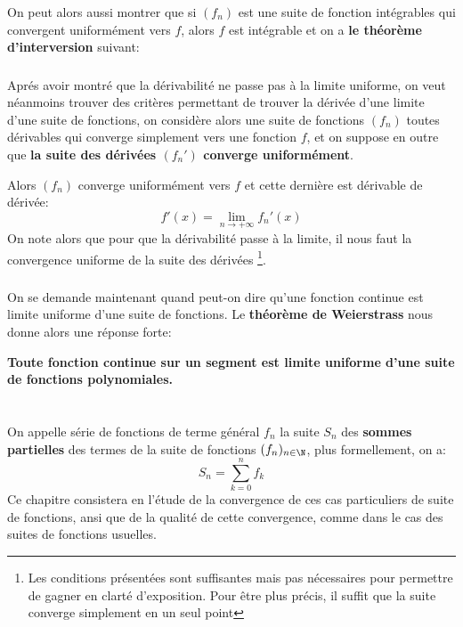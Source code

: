 \subsection*{}
On peut alors aussi montrer que si \((f_n)\) est une suite de fonction intégrables qui convergent uniformément vers \(f\), alors \(f\) est intégrable et on a \textbf{le théorème d'interversion} suivant:
\subsection*{}
Aprés avoir montré que la dérivabilité ne passe pas à la limite uniforme, on veut néanmoins trouver des critères permettant de trouver la dérivée d'une limite d'une suite de fonctions, on considère alors une suite de fonctions \((f_n)\) toutes dérivables qui converge simplement vers une fonction \(f\), et on suppose en outre que \textbf{la suite des dérivées \((f_n')\) converge uniformément}.\<

Alors \((f_n)\) converge uniformément vers \(f\) et cette dernière est dérivable de dérivée:
\[
   f'(x) = \lim_{n \rightarrow +\infty} f_n'(x)
\] 
On note alors que pour que la dérivabilité passe à la limite, il nous faut la convergence uniforme de la suite des dérivées \footnote[1]{Les conditions présentées sont suffisantes mais pas nécessaires pour permettre de gagner en clarté d'exposition. Pour être plus précis, il suffit que la suite converge simplement en un seul point}.
\subsection*{}
On se demande maintenant quand peut-on dire qu'une fonction continue est limite uniforme d'une suite de fonctions. Le \textbf{théorème de Weierstrass} nous donne alors une réponse forte:
\begin{center}
   \textbf{Toute fonction continue sur un segment est limite uniforme d'une suite de fonctions polynomiales.}
\end{center}

\chapter*{}
On appelle série de fonctions de terme général \(f_n\) la suite \(S_n\) des \textbf{sommes partielles} des termes de la suite de fonctions \((f_n)_{n\in\N}\), plus formellement, on a:
\[
   S_n = \sum_{k=0}^{n} f_k   
\]
Ce chapitre consistera en l'étude de la convergence de ces cas particuliers de suite de fonctions, ansi que de la qualité de cette convergence, comme dans le cas des suites de fonctions usuelles. 
